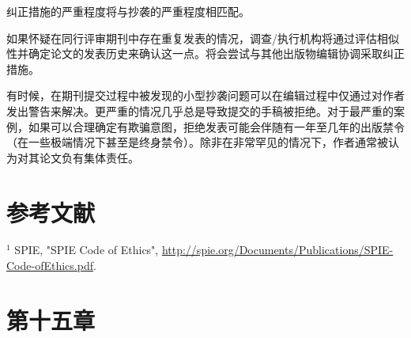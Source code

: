 纠正措施的严重程度将与抄袭的严重程度相匹配。

如果怀疑在同行评审期刊中存在重复发表的情况，调查/执行机构将通过评估相似性并确定论文的发表历史来确认这一点。将会尝试与其他出版物编辑协调采取纠正措施。

有时候，在期刊提交过程中被发现的小型抄袭问题可以在编辑过程中仅通过对作者发出警告来解决。更严重的情况几乎总是导致提交的手稿被拒绝。对于最严重的案例，如果可以合理确定有欺骗意图，拒绝发表可能会伴随有一年至几年的出版禁令（在一些极端情况下甚至是终身禁令）。除非在非常罕见的情况下，作者通常被认为对其论文负有集体责任。

\section*{参考文献}
${ }^{1}$ SPIE, "SPIE Code of Ethics", \href{http://spie.org/Documents/Publications/SPIE-Code-ofEthics.pdf}{http://spie.org/Documents/Publications/SPIE-Code-ofEthics.pdf}.

\section*{第十五章}
